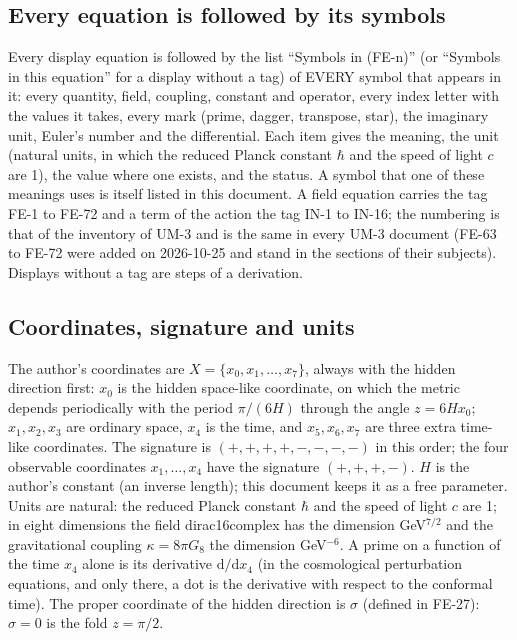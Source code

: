 \documentclass[
  10pt,
]{article}
\begin{document}
\hypertarget{every-equation-is-followed-by-its-symbols}{%
\subsection{Every equation is followed by its
symbols}\label{every-equation-is-followed-by-its-symbols}}

Every display equation is followed by the list ``Symbols in (FE-n)'' (or
``Symbols in this equation'' for a display without a tag) of EVERY
symbol that appears in it: every quantity, field, coupling, constant and
operator, every index letter with the values it takes, every mark
(prime, dagger, transpose, star), the imaginary unit, Euler's number and
the differential. Each item gives the meaning, the unit (natural units,
in which the reduced Planck constant \(\hbar\) and the speed of light
\(c\) are 1), the value where one exists, and the status. A symbol that
one of these meanings uses is itself listed in this document. A field
equation carries the tag FE-1 to FE-72 and a term of the action the tag
IN-1 to IN-16; the numbering is that of the inventory of UM-3 and is the
same in every UM-3 document (FE-63 to FE-72 were added on 2026-10-25 and
stand in the sections of their subjects). Displays without a tag are
steps of a derivation.

\hypertarget{coordinates-signature-and-units}{%
\subsection{Coordinates, signature and
units}\label{coordinates-signature-and-units}}

The author's coordinates are \(X = \{x_0, x_1, \dots, x_7\}\), always
with the hidden direction first: \(x_0\) is the hidden space-like
coordinate, on which the metric depends periodically with the period
\(\pi/(6H)\) through the angle \(z = 6Hx_0\); \(x_1, x_2, x_3\) are
ordinary space, \(x_4\) is the time, and \(x_5, x_6, x_7\) are three
extra time-like coordinates. The signature is \((+,+,+,+,-,-,-,-)\) in
this order; the four observable coordinates \(x_1, \dots, x_4\) have the
signature \((+,+,+,-)\). \(H\) is the author's constant (an inverse
length); this document keeps it as a free parameter. Units are natural:
the reduced Planck constant \(\hbar\) and the speed of light \(c\) are
1; in eight dimensions the field dirac16complex has the dimension
GeV\(^{7/2}\) and the gravitational coupling \(\kappa = 8\pi G_8\) the
dimension GeV\(^{-6}\). A prime on a function of the time \(x_4\) alone
is its derivative \(\mathrm{d}/\mathrm{d}x_4\) (in the cosmological
perturbation equations, and only there, a dot is the derivative with
respect to the conformal time). The proper coordinate of the hidden
direction is \(\sigma\) (defined in FE-27): \(\sigma = 0\) is the fold
\(z = \pi/2\).
\end{document}
